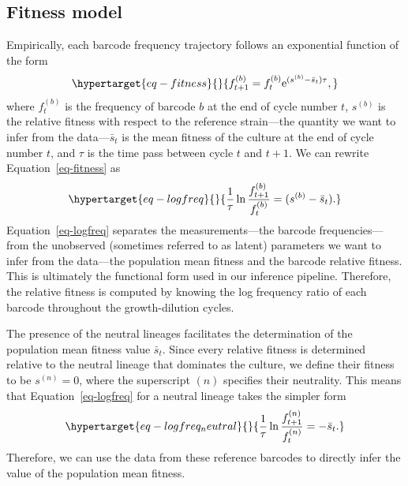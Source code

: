 \documentclass[
  letterpaper,
  DIV=11,
  numbers=noendperiod]{scrartcl}
\begin{document}
\begin{refsegment}
\hypertarget{sec-fitness_model}{%
\subsection{Fitness model}\label{sec-fitness_model}}

Empirically, each barcode frequency trajectory follows an exponential
function of the form \autocite{levy2015,kinsler2020,ascensao2023}
\begin{equation}\protect\hypertarget{eq-fitness}{}{
f_{t+1}^{(b)} = f_{t}^{(b)} \mathrm{e}^{(s^{(b)} - \bar{s}_t)\tau},
}\label{eq-fitness}\end{equation} where \(f_{t}^{(b)}\) is the frequency
of barcode \(b\) at the end of cycle number \(t\), \(s^{(b)}\) is the
relative fitness with respect to the reference strain---the quantity we
want to infer from the data---\(\bar{s}_t\) is the mean fitness of the
culture at the end of cycle number \(t\), and \(\tau\) is the time pass
between cycle \(t\) and \(t+1\). We can rewrite
Equation~\ref{eq-fitness} as
\begin{equation}\protect\hypertarget{eq-logfreq}{}{
\frac{1}{\tau}\ln \frac{f_{t+1}^{(b)}}{f_{t}^{(b)}} = (s^{(b)} - \bar{s}_t).
}\label{eq-logfreq}\end{equation} Equation~\ref{eq-logfreq} separates
the measurements---the barcode frequencies---from the unobserved
(sometimes referred to as latent) parameters we want to infer from the
data---the population mean fitness and the barcode relative fitness.
This is ultimately the functional form used in our inference pipeline.
Therefore, the relative fitness is computed by knowing the log frequency
ratio of each barcode throughout the growth-dilution cycles.

The presence of the neutral lineages facilitates the determination of
the population mean fitness value \(\bar{s}_t\). Since every relative
fitness is determined relative to the neutral lineage that dominates the
culture, we define their fitness to be \(s^{(n)} = 0\), where the
superscript \((n)\) specifies their neutrality. This means that
Equation~\ref{eq-logfreq} for a neutral lineage takes the simpler form
\begin{equation}\protect\hypertarget{eq-logfreq_neutral}{}{
\frac{1}{\tau}\ln \frac{f_{t+1}^{(n)}}{f_{t}^{(n)}} = - \bar{s}_t.
}\label{eq-logfreq_neutral}\end{equation} Therefore, we can use the data
from these reference barcodes to directly infer the value of the
population mean fitness.


\end{refsegment}
\end{document}
